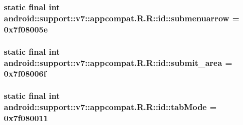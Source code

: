 \hypertarget{classandroid_1_1support_1_1v7_1_1appcompat_1_1_r_1_1id_917f9f77e3511f2bbc151965253e97fd}{
\subsubsection[{submenuarrow}]{\setlength{\rightskip}{0pt plus 5cm}static final int android::support::v7::appcompat.R.R::id::submenuarrow = 0x7f08005e}}
\label{classandroid_1_1support_1_1v7_1_1appcompat_1_1_r_1_1id_917f9f77e3511f2bbc151965253e97fd}


\hypertarget{classandroid_1_1support_1_1v7_1_1appcompat_1_1_r_1_1id_8b07b2fb1cfeaf29beb8c8fb9a1f1bda}{
\subsubsection[{submit\_\-area}]{\setlength{\rightskip}{0pt plus 5cm}static final int android::support::v7::appcompat.R.R::id::submit\_\-area = 0x7f08006f}}
\label{classandroid_1_1support_1_1v7_1_1appcompat_1_1_r_1_1id_8b07b2fb1cfeaf29beb8c8fb9a1f1bda}


\hypertarget{classandroid_1_1support_1_1v7_1_1appcompat_1_1_r_1_1id_0c1ce60a4f406ddc25e4ebaa0daa1c64}{
\subsubsection[{tabMode}]{\setlength{\rightskip}{0pt plus 5cm}static final int android::support::v7::appcompat.R.R::id::tabMode = 0x7f080011}}
\label{classandroid_1_1support_1_1v7_1_1appcompat_1_1_r_1_1id_0c1ce60a4f406ddc25e4ebaa0daa1c64}


